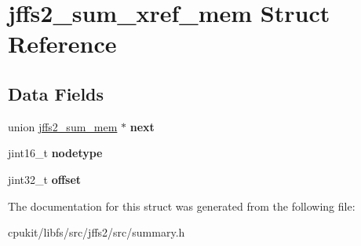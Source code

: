 \hypertarget{structjffs2__sum__xref__mem}{}\section{jffs2\+\_\+sum\+\_\+xref\+\_\+mem Struct Reference}
\label{structjffs2__sum__xref__mem}
\subsection*{Data Fields}
\begin{DoxyCompactItemize}
\item 
\mbox{\label{structjffs2__sum__xref__mem_a7efe0d4b196043736df1ff4a140762e4}} 
union \mbox{\hyperlink{unionjffs2__sum__mem}{jffs2\+\_\+sum\+\_\+mem}} $\ast$ {\bfseries next}
\item 
\mbox{\label{structjffs2__sum__xref__mem_a71bf215b5f7c59d4f6a9a6fc5960f4e9}} 
jint16\+\_\+t {\bfseries nodetype}
\item 
\mbox{\label{structjffs2__sum__xref__mem_af8b6c15cf157a7bef14ec9ce171c9744}} 
jint32\+\_\+t {\bfseries offset}
\end{DoxyCompactItemize}


The documentation for this struct was generated from the following file\+:\begin{DoxyCompactItemize}
\item 
cpukit/libfs/src/jffs2/src/summary.\+h\end{DoxyCompactItemize}
